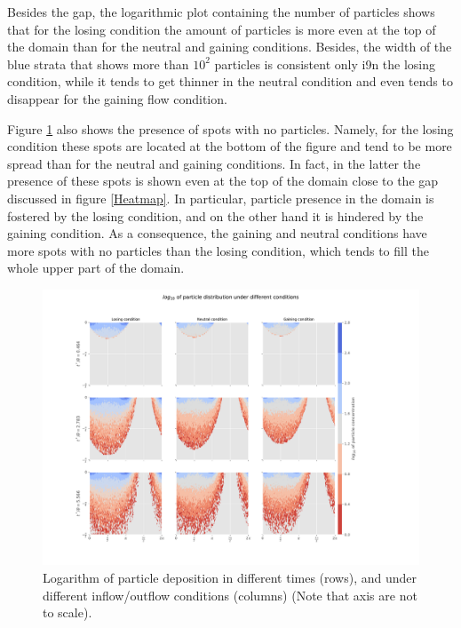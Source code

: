 \documentclass[draft,linenumbers]{agujournal2018}
\begin{document}
Besides the gap, the logarithmic plot containing the number of particles shows that for the losing condition the amount of particles is more even at the top of the domain than for the neutral and gaining conditions. Besides, the width of the blue strata that shows more than $10^2$ particles is consistent only i9n the losing condition, while it tends to get thinner in the neutral condition and even tends to disappear for the gaining flow condition.

Figure \ref{Logmap} also shows the presence of spots with no particles. Namely, for the losing condition these spots are located at the bottom of the figure and tend to be more spread than for the neutral and gaining conditions. In fact, in the latter the presence of these spots is shown even at the top of the domain close to the gap discussed in figure \ref{Heatmap}. In particular, particle presence in the domain is fostered by the losing condition, and on the other hand it is hindered by the gaining condition. As a consequence, the gaining and neutral conditions have more spots with no particles than the losing condition, which tends to fill the whole upper part of the domain.

\begin{figure}[ht]
\centering
\includegraphics[trim=0.2cm 0.2cm 0.2cm 0.2cm, width=45pc]
{181203_Logplot.pdf}
\caption{Logarithm of particle deposition in different times (rows), and under different inflow/outflow conditions (columns) (Note that axis are not to scale).}
\label{Logmap}
\end{figure}
\end{document}

